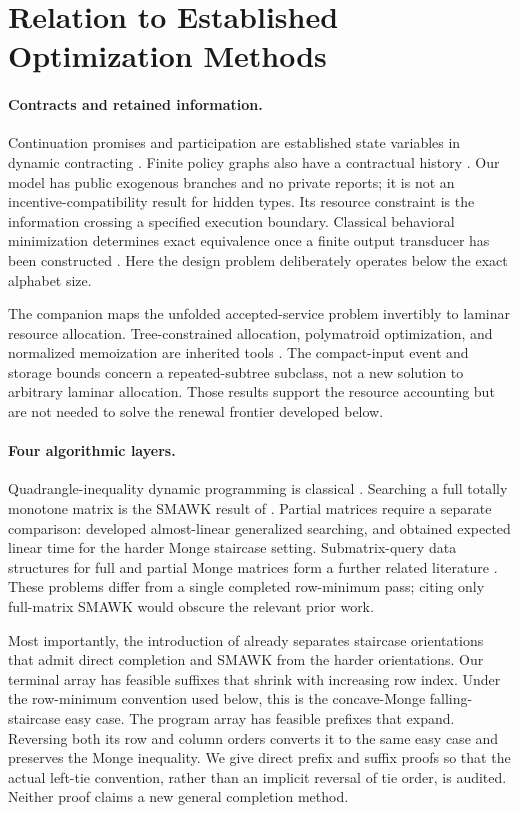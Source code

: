 \section{Relation to Established Optimization Methods}\label{sec:r37-position}
\paragraph{Contracts and retained information.}
Continuation promises and participation are established state variables in dynamic contracting \citep{SpearSrivastava1987,ThomasWorrall1988}. Finite policy graphs also have a contractual history \citep{Zhang2012}. Our model has public exogenous branches and no private reports; it is not an incentive-compatibility result for hidden types. Its resource constraint is the information crossing a specified execution boundary. Classical behavioral minimization determines exact equivalence once a finite output transducer has been constructed \citep{GivanDeanGreig2003,Peyriere2023}. Here the design problem deliberately operates below the exact alphabet size.

The companion maps the unfolded accepted-service problem invertibly to laminar resource allocation. Tree-constrained allocation, polymatroid optimization, and normalized memoization are inherited tools \citep{Mjelde1983,Tang1990,FedergruenGroenevelt1986,Groenevelt1991}. The compact-input event and storage bounds concern a repeated-subtree subclass, not a new solution to arbitrary laminar allocation. Those results support the resource accounting but are not needed to solve the renewal frontier developed below.

\paragraph{Four algorithmic layers.}
Quadrangle-inequality dynamic programming is classical \citep{Yao1980}. Searching a full totally monotone matrix is the SMAWK result of \citet{AggarwalEtAl1987}. Partial matrices require a separate comparison: \citet{KlaweKleitman1990} developed almost-linear generalized searching, and \citet{Chan2021} obtained expected linear time for the harder Monge staircase setting. Submatrix-query data structures for full and partial Monge matrices form a further related literature \citep{Kaplan2017}. These problems differ from a single completed row-minimum pass; citing only full-matrix SMAWK would obscure the relevant prior work.

Most importantly, the introduction of \citet[pp.~2--3 of the author version]{Chan2021} already separates staircase orientations that admit direct completion and SMAWK from the harder orientations. Our terminal array has feasible suffixes that shrink with increasing row index. Under the row-minimum convention used below, this is the concave-Monge falling-staircase easy case. The program array has feasible prefixes that expand. Reversing both its row and column orders converts it to the same easy case and preserves the Monge inequality. We give direct prefix and suffix proofs so that the actual left-tie convention, rather than an implicit reversal of tie order, is audited. Neither proof claims a new general completion method.

